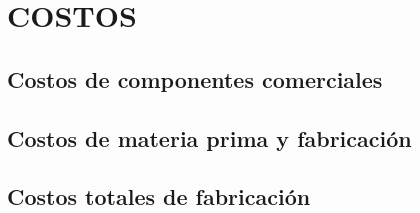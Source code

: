 \chapter{\MakeUppercase{Costos}}  \label{ct_design}
\thispagestyle{mainmatterstyle} %
\section{Costos de componentes comerciales}
\section{Costos de materia prima y fabricación}
\section{Costos totales de fabricación}
